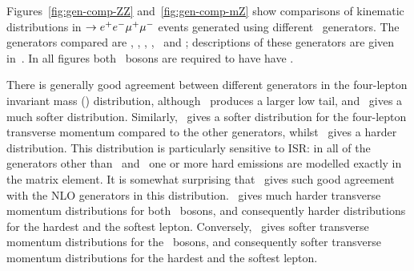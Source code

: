 
Figures~\ref{fig:gen-comp-ZZ} and~\ref{fig:gen-comp-mZ} show 
comparisons of kinematic distributions in \qqZZ
$\rightarrow e^{+}e^{-}\mu^{+}\mu^{-}$ 
events generated using different \mc\ generators. The generators compared are
\sherpa, \mcatnlo, \powhegbox, \herwig, \herwigPP\ and \pythia; descriptions of
these generators are given in~. In all figures both \Z\
bosons are required to have have \sstooos. 

There is generally good agreement between different generators in the
four-lepton invariant mass (\mZZ) distribution, although \sherpa\ produces a
larger low tail, and \mcatnlo\ gives a much softer distribution. Similarly,
\mcatnlo\ gives a softer distribution for the four-lepton transverse momentum
compared to the other generators, whilst \pythia\ gives a harder distribution.
This distribution is particularly sensitive to ISR: in all of the generators
other than \pythia\ and \herwig\ one or more hard emissions are modelled exactly
in the matrix element. It is somewhat surprising that \herwig\ gives such good
agreement with the NLO generators in this distribution. \herwig\ gives much
harder transverse momentum distributions for both \Z\ bosons, and consequently
harder distributions for the hardest and the softest lepton. Conversely,
\mcatnlo\ gives softer transverse momentum distributions for the \Z\ bosons, and
consequently softer transverse momentum distributions for the hardest and the
softest lepton.

